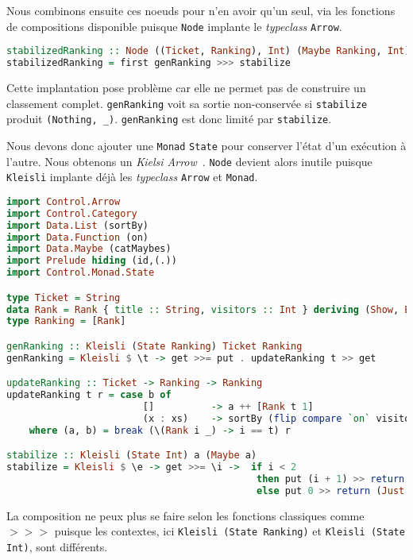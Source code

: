 \documentclass{llncs}
\newcommand{\Arr}{\texttt{Arrow} }
\newcommand{\Arrp}{\texttt{Arrow}. }
\begin{document}
Nous combinons ensuite ces noeuds pour n'en avoir qu'un seul, via les fonctions
de compositions disponible puisque \texttt{Node} implante le \emph{typeclass} \Arrp
\begin{lstlisting}[language=haskell]
stabilizedRanking :: Node ((Ticket, Ranking), Int) (Maybe Ranking, Int)
stabilizedRanking = first genRanking >>> stabilize
\end{lstlisting}

Cette implantation pose problème car elle ne permet pas de construire un classement
complet. \texttt{genRanking} voit sa sortie non-conservée si \texttt{stabilize}
produit \texttt{(Nothing, \_)}.
\texttt{genRanking} est donc limité par \texttt{stabilize}.

Nous devons donc ajouter une \texttt{Monad} \texttt{State} pour conserver l'état d'un exécution à l'autre.
Nous obtenons un \emph{Kielsi Arrow}~\cite{Hughes00}.
\texttt{Node} devient alors inutile puisque \texttt{Kleisli} implante déjà les
\emph{typeclass} \Arr et \texttt{Monad}.


\begin{lstlisting}[language=haskell]
import Control.Arrow
import Control.Category
import Data.List (sortBy)
import Data.Function (on)
import Data.Maybe (catMaybes)
import Prelude hiding (id,(.))
import Control.Monad.State

type Ticket = String
data Rank = Rank { title :: String, visitors :: Int } deriving (Show, Eq)
type Ranking = [Rank]

genRanking :: Kleisli (State Ranking) Ticket Ranking
genRanking = Kleisli $ \t -> get >>= put . updateRanking t >> get

updateRanking :: Ticket -> Ranking -> Ranking
updateRanking t r = case b of
                        []          -> a ++ [Rank t 1]
                        (x : xs)    -> sortBy (flip compare `on` visitors) (Rank t (1 + visitors x) : a ++ xs)
    where (a, b) = break (\(Rank i _) -> i == t) r

stabilize :: Kleisli (State Int) a (Maybe a)
stabilize = Kleisli $ \e -> get >>= \i ->  if i < 2
                                            then put (i + 1) >> return Nothing
                                            else put 0 >> return (Just e)
\end{lstlisting}

La composition ne peux plus se faire selon les fonctions classiques comme $>>>$
puisque les contextes, ici \texttt{Kleisli (State Ranking)} et \texttt{Kleisli (State Int)},
sont différents.
\end{document}
